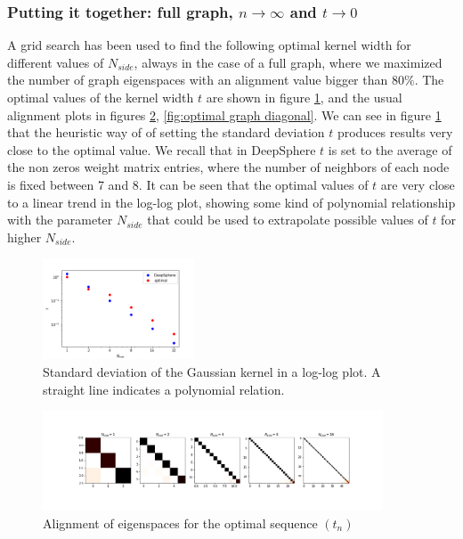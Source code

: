 \subsubsection{Putting it together: full graph, $n\to\infty$ and $t\to 0$}
A grid search has been used to find the following optimal kernel width for different values of $N_{side}$, always in the case of a full graph, where we maximized the number of graph eigenspaces with an alignment value bigger than $80\%$. The optimal values of the kernel width $t$ are shown in figure \ref{fig:t}, and the usual alignment plots in figures \ref{fig:optimal graph}, \ref{fig:optimal graph diagonal}. We can see in figure \ref{fig:t} that the heuristic way of \cite{DeepSphere} of setting the standard deviation $t$ produces results very close to the optimal value. We recall that in DeepSphere $t$ is set to the average of the non zeros weight matrix entries, where the number of neighbors of each node is fixed between 7 and 8. It can be seen that the optimal values of $t$ are very close to a linear trend in the log-log plot, showing some kind of polynomial relationship with the parameter $N_{side}$ that could be used to extrapolate possible values of $t$ for higher $N_{side}$.
\begin{figure}[h]
	\centering
	\includegraphics[width=0.4\textwidth]{../codes/02.HeatKernelGraphLaplacian/HEALPix/06_figures/kernelwidth.png}
\caption{\label{fig:t}Standard deviation of the Gaussian kernel  in a log-log plot. A straight line indicates a polynomial relation.}
\end{figure}
\begin{figure}[h]
	\centering
	\includegraphics[width=0.9\textwidth]{../codes/02.HeatKernelGraphLaplacian/HEALPix/06_figures/optimal_full.png}	
\caption{\label{fig:optimal graph}Alignment of eigenspaces for the optimal sequence $(t_n)$}
\end{figure}
